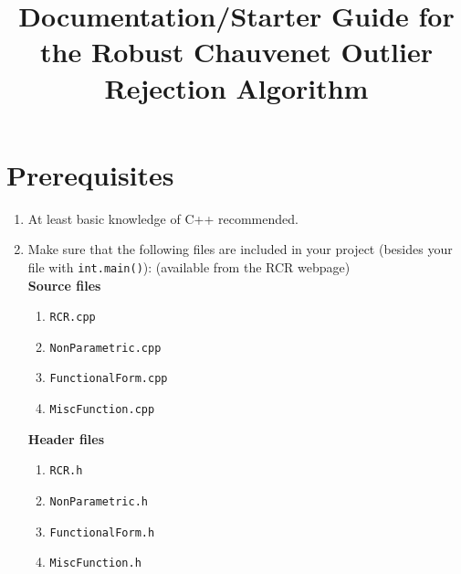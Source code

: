 \documentclass[12pt]{article}
\title{Documentation/Starter Guide for the Robust Chauvenet Outlier Rejection Algorithm}
\begin{document}
	
\maketitle
\section*{Prerequisites}
\begin{enumerate}
	\item At least basic knowledge of C++ recommended.
	\item Make sure that the following files are included in your project (besides your file with \texttt{int.main()}): (available from the RCR webpage)
	\\\textbf{Source files}
	\begin{enumerate}
		\item \texttt{RCR.cpp}
		\item \texttt{NonParametric.cpp}
		\item \texttt{FunctionalForm.cpp}
		\item \texttt{MiscFunction.cpp}
	\end{enumerate}
	\textbf{Header files}
	\begin{enumerate}
		\item \texttt{RCR.h}
		\item \texttt{NonParametric.h}
		\item \texttt{FunctionalForm.h}
		\item \texttt{MiscFunction.h}
	\end{enumerate}
\end{enumerate}
\end{document}

